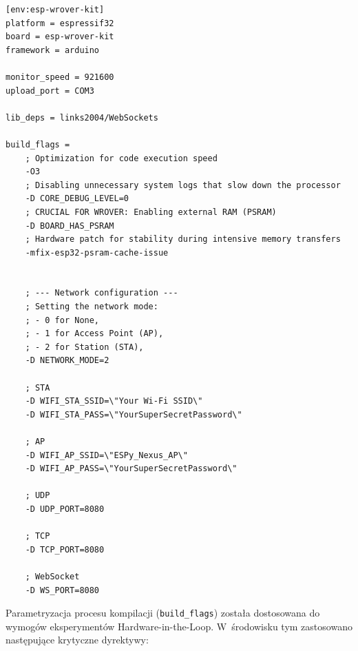 \begin{listing}[htbp]
    \caption{Deklaratywna konfiguracja środowiska kompilacji w~ekosystemie PlatformIO (\texttt{platformio.ini}) \cite{espy_nexus_esp32_firmware}.}
    \label{lst:platformio_ini}
    \begin{verbatim}
[env:esp-wrover-kit]
platform = espressif32
board = esp-wrover-kit
framework = arduino

monitor_speed = 921600
upload_port = COM3

lib_deps = links2004/WebSockets

build_flags = 
    ; Optimization for code execution speed
    -O3
    ; Disabling unnecessary system logs that slow down the processor
    -D CORE_DEBUG_LEVEL=0
    ; CRUCIAL FOR WROVER: Enabling external RAM (PSRAM)
    -D BOARD_HAS_PSRAM
    ; Hardware patch for stability during intensive memory transfers
    -mfix-esp32-psram-cache-issue


    ; --- Network configuration ---
    ; Setting the network mode: 
    ; - 0 for None,
    ; - 1 for Access Point (AP),
    ; - 2 for Station (STA), 
    -D NETWORK_MODE=2
    
    ; STA
    -D WIFI_STA_SSID=\"Your Wi-Fi SSID\"
    -D WIFI_STA_PASS=\"YourSuperSecretPassword\"
    
    ; AP
    -D WIFI_AP_SSID=\"ESPy_Nexus_AP\"
    -D WIFI_AP_PASS=\"YourSuperSecretPassword\"
    
    ; UDP
    -D UDP_PORT=8080

    ; TCP
    -D TCP_PORT=8080

    ; WebSocket
    -D WS_PORT=8080
\end{verbatim}
\end{listing}

Parametryzacja procesu kompilacji (\texttt{build\_flags}) została dostosowana do wymogów eksperymentów Hardware-in-the-Loop.
W~środowisku tym zastosowano następujące krytyczne dyrektywy:

